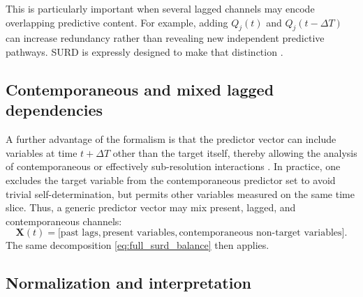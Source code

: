 \documentclass[fleqn,usenatbib]{mnras}
\begin{document}
This is particularly important when several lagged channels may encode overlapping predictive content. For example, adding \(Q_j(t)\) and \(Q_j(t-\Delta T)\) can increase redundancy rather than revealing new independent predictive pathways. SURD is expressly designed to make that distinction \cite{MartinezSanchez2024SURD}.

\subsection{Contemporaneous and mixed lagged dependencies}

A further advantage of the formalism is that the predictor vector can include variables at time \(t+\Delta T\) other than the target itself, thereby allowing the analysis of contemporaneous or effectively sub-resolution interactions \cite{MartinezSanchez2024SURD}. In practice, one excludes the target variable from the contemporaneous predictor set to avoid trivial self-determination, but permits other variables measured on the same time slice. Thus, a generic predictor vector may mix present, lagged, and contemporaneous channels:
\begin{equation}
\mathbf{X}(t)=
\bigl[
\text{past lags},
\text{present variables},
\text{contemporaneous non-target variables}
\bigr].
\end{equation}
The same decomposition \eqref{eq:full_surd_balance} then applies.

\subsection{Normalization and interpretation}
\end{document}
